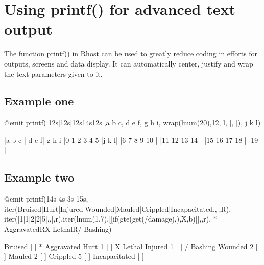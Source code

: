 \documentclass[letterpaper,10pt,english]{sphinxmanual}
\begin{document}
\section{Using printf() for advanced text output}
\label{\detokenize{advanced:using-printf-for-advanced-text-output}}
\sphinxAtStartPar
The function printf() in Rhost can be used to greatly reduce coding in efforts for outputs,
screens and data display.  It can automatically center, justify and wrap the text parameters given to it.


\subsection{Example one}
\label{\detokenize{advanced:example-one}}
\begin{sphinxVerbatim}[commandchars=\\\{\}]
@emit printf(|\PYGZdl{}\PYGZhy{}12s|\PYGZdl{}12s|\PYGZdl{}\PYGZca{}12s\PYGZdl{}\PYGZam{}14s\PYGZdl{}\PYGZus{}12s|,a b c, d e f, g h i, wrap(lnum(20),12, l, |, |), j k l)

|a b c       |       d e f|   g h i    |0 1 2 3 4 5 |j     k    l|
                                       |6 7 8 9 10  |
                                       |11 12 13 14 |
                                       |15 16 17 18 |
                                       |19          |
\end{sphinxVerbatim}


\subsection{Example two}
\label{\detokenize{advanced:example-two}}
\begin{sphinxVerbatim}[commandchars=\\\{\}]
  @emit printf(\PYGZdl{}14\PYGZam{}s \PYGZdl{}\PYGZca{}4\PYGZam{}s \PYGZdl{}\PYGZhy{}3\PYGZam{}s \PYGZdl{}15\PYGZam{}s,
  iter(Bruised|Hurt|Injured|Wounded|Mauled|Crippled|Incapacitated,\PYGZsh{}\PYGZsh{},|,\PYGZpc{}R),
  iter(|\PYGZhy{}1|\PYGZhy{}1|\PYGZhy{}2|\PYGZhy{}2|\PYGZhy{}5|,\PYGZsh{}\PYGZsh{},|,\PYGZpc{}r),iter(lnum(1,7),\PYGZpc{}[[if(gte(get(\PYGZpc{}\PYGZsh{}/damage),\PYGZsh{}\PYGZsh{}),X,\PYGZpc{}b)]\PYGZpc{}],,\PYGZpc{}r),
  * Aggravated\PYGZpc{}RX Lethal\PYGZpc{}R/ Bashing)

      Bruised      [ ]    * Aggravated
         Hurt  \PYGZhy{}1  [ ]        X Lethal
      Injured  \PYGZhy{}1  [ ]       / Bashing
      Wounded  \PYGZhy{}2  [ ]
       Mauled  \PYGZhy{}2  [ ]
     Crippled  \PYGZhy{}5  [ ]
Incapacitated      [ ]
\end{sphinxVerbatim}
\end{document}

